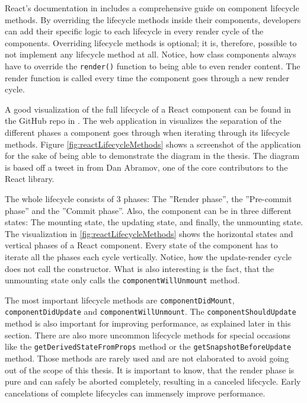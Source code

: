 React's documentation in \cite[/docs/react-component.html]{React} includes a comprehensive guide on component lifecycle methods. By overriding the lifecycle methods inside their components, developers can add their specific logic to each lifecycle in every render cycle of the components. Overriding lifecycle methods is optional; it is, therefore, possible to not implement any lifecycle method at all. Notice, how class components always have to override the \texttt{render()} function to being able to even render content. The render function is called every time the component goes through a new render cycle.

A good visualization of the full lifecycle of a React component can be found in the GitHub repo in \cite{ReactRenderCycleGithub}. The web application in \cite{ReactRenderCycleDiagram} visualizes the separation of the different phases a component goes through when iterating through its lifecycle methods. Figure \ref{fig:reactLifecycleMethods} shows a screenshot of the application for the sake of being able to demonstrate the diagram in the thesis. The diagram is based off a tweet in \cite{ReactCycleTweet} from Dan Abramov, one of the core contributors to the React library.

The whole lifecycle consists of 3 phases: The ''Render phase'', the ''Pre-commit phase'' and the ''Commit phase''. Also, the component can be in three different states: The mounting state, the updating state, and finally, the unmounting state. The visualization in \ref{fig:reactLifecycleMethods} shows the horizontal states and vertical phases of a React component. Every state of the component has to iterate all the phases each cycle vertically. Notice, how the update-render cycle does not call the constructor. What is also interesting is the fact, that the unmounting state only calls the \texttt{componentWillUnmount} method.

The most important lifecycle methods are \texttt{componentDidMount}, \texttt{componentDidUpdate} and \texttt{componentWillUnmount}. The \texttt{componentShouldUpdate} method is also important for improving performance, as explained later in this section. There are also more uncommon lifecycle methods for special occasions like the \texttt{getDerivedStateFromProps} method or the \texttt{getSnapshotBeforeUpdate} method. Those methods are rarely used and are not elaborated to avoid going out of the scope of this thesis. It is important to know, that the render phase is pure and can safely be aborted completely, resulting in a canceled lifecycle. Early cancelations of complete lifecycles can immensely improve performance.

